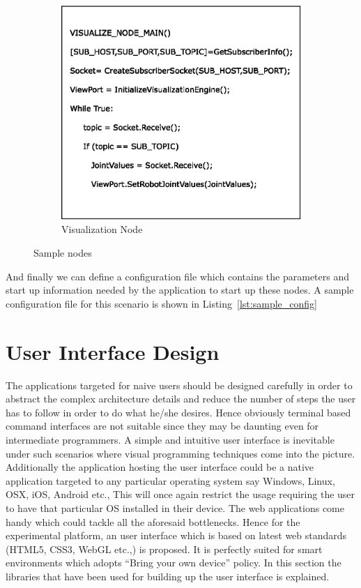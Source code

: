 \begin{figure}[H]
\begin{subfigure}[t]{0.48\textwidth}
\includegraphics[width=\textwidth]{assets/sample_node_B.eps}
\caption[Visualization Node]{Visualization Node}
\label{fig:node_b}
\end{subfigure}
\caption[Sample nodes]{Sample nodes}
\label{fig:pseudo_nodes}
\end{figure}
And finally we can define a configuration file which contains the parameters and start up information needed by the application to start up these nodes. A sample configuration file for this scenario is shown in Listing~\ref{lst:sample_config}



\section{User Interface Design}
\label{sec:ui_design}
The applications targeted for naive users should be designed carefully in order to abstract the complex architecture details and reduce the number of steps the user has to follow in order to do what he/she desires. Hence obviously terminal based command interfaces are not suitable since they may be daunting even for intermediate programmers. A simple and intuitive user interface is inevitable under such scenarios where visual programming techniques come into the picture. Additionally the application hosting the user interface could be a native application targeted to any particular operating system say Windows, Linux, OSX, iOS, Android etc., This will once again restrict the usage requiring the user to have that particular OS installed in their device. The web applications come handy which could tackle all the aforesaid bottlenecks. Hence for the experimental platform, an user interface which is based on latest web standards (HTML5, CSS3, WebGL etc.,) is proposed. It is perfectly suited for smart environments which adopts ``Bring your own device'' policy. In this section the libraries that have been used for building up the user interface is explained.

